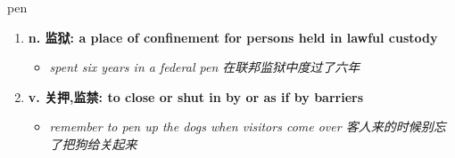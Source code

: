
\begin{frame}
{\huge pen}
\begin{center}
\begin{enumerate}\Large
  \item \textbf{n. 监狱: a place of confinement for persons held in lawful custody}
  \begin{itemize}
    \item \em{\Large{spent six years in a federal pen 在联邦监狱中度过了六年}}
  \end{itemize}
  \item \textbf{v. 关押,监禁: to close or shut in by or as if by barriers}
  \begin{itemize}
    \item \em{\Large{remember to pen up the dogs when visitors come over 客人来的时候别忘了把狗给关起来}}
  \end{itemize}
\end{enumerate}
\end{center}
\end{frame}
